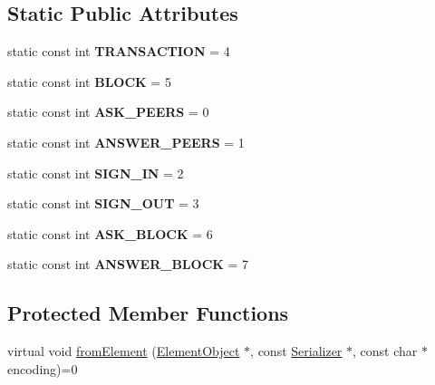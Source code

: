 \subsection*{Static Public Attributes}
\begin{DoxyCompactItemize}
\item 
\mbox{\label{classMessage_a18a7a0d3879210c798f3d84c820f03c1}} 
static const int {\bfseries T\+R\+A\+N\+S\+A\+C\+T\+I\+ON} = 4
\item 
\mbox{\label{classMessage_a3d3ef3111518cd65c0b7f5ec6660888a}} 
static const int {\bfseries B\+L\+O\+CK} = 5
\item 
\mbox{\label{classMessage_a9810d3cefb1b33e709cb393583a7a877}} 
static const int {\bfseries A\+S\+K\+\_\+\+P\+E\+E\+RS} = 0
\item 
\mbox{\label{classMessage_aa33f42e5795c4df01c7437961d512eaa}} 
static const int {\bfseries A\+N\+S\+W\+E\+R\+\_\+\+P\+E\+E\+RS} = 1
\item 
\mbox{\label{classMessage_a64b7688dfdd50a6254bf45b51d2118d4}} 
static const int {\bfseries S\+I\+G\+N\+\_\+\+IN} = 2
\item 
\mbox{\label{classMessage_aba70c352293fee66004d729ccef3ee48}} 
static const int {\bfseries S\+I\+G\+N\+\_\+\+O\+UT} = 3
\item 
\mbox{\label{classMessage_a62ac5b91838e79a11079869015261e14}} 
static const int {\bfseries A\+S\+K\+\_\+\+B\+L\+O\+CK} = 6
\item 
\mbox{\label{classMessage_a1580f4a26d125f71e2af1ef6001ac656}} 
static const int {\bfseries A\+N\+S\+W\+E\+R\+\_\+\+B\+L\+O\+CK} = 7
\end{DoxyCompactItemize}
\subsection*{Protected Member Functions}
\begin{DoxyCompactItemize}
\item 
virtual void \mbox{\hyperlink{classComponent_a2ded18881226d0077dc393e0e9304bb1}{from\+Element}} (\mbox{\hyperlink{classElementObject}{Element\+Object}} $\ast$, const \mbox{\hyperlink{classSerializer}{Serializer}} $\ast$, const char $\ast$encoding)=0
\end{DoxyCompactItemize}
